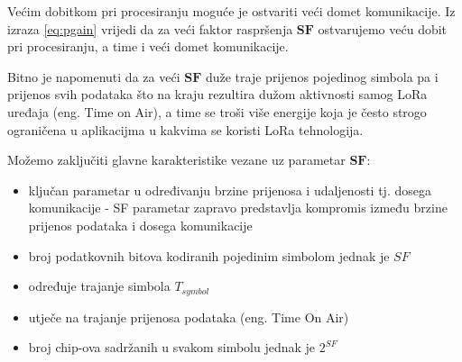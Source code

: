 \noindent
Većim dobitkom pri procesiranju moguće je ostvariti veći domet komunikacije. Iz izraza \ref{eq:pgain} vrijedi da za veći faktor raspršenja $\mathbf{SF}$ ostvarujemo veću dobit pri procesiranju, a time i veći domet komunikacije.

Bitno je napomenuti da za veći $\mathbf{SF}$ duže traje prijenos pojedinog simbola pa i prijenos svih podataka što na kraju rezultira dužom aktivnosti samog LoRa uređaja (eng. Time on Air), a time se troši više energije koja je često strogo ograničena u aplikacijma u kakvima se koristi LoRa tehnologija.
\newline

Možemo zaključiti glavne karakteristike vezane uz parametar $\mathbf{SF}$:
\begin{itemize}
\item ključan parametar u određivanju brzine prijenosa i udaljenosti tj. dosega komunikacije - SF parametar zapravo predstavlja kompromis između brzine prijenos podataka i dosega komunikacije
\item broj podatkovnih bitova kodiranih pojedinim simbolom jednak je $SF$
\item određuje trajanje simbola $T_{symbol}$
\item utječe na trajanje prijenosa podataka (eng. Time On Air)
\item broj chip-ova sadržanih u svakom simbolu jednak je $2^{SF}$
\end{itemize}

